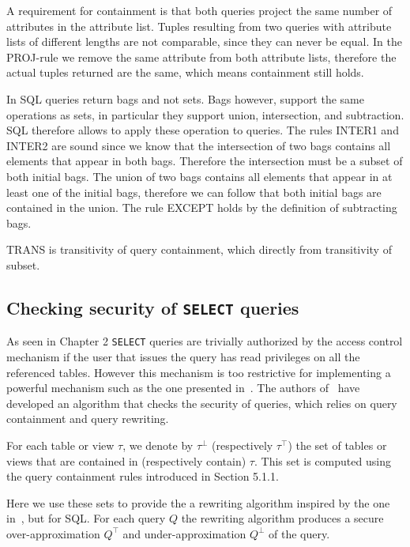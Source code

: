 A requirement for containment is that both queries project the same number of attributes in the attribute list. 
%
Tuples resulting from two queries with attribute lists of different lengths are not comparable, since they can never be equal.
%
In the PROJ-rule we remove the same attribute from both attribute lists, therefore the actual tuples returned are the same, which means containment still holds.

In SQL queries return bags and not sets.
%
Bags however, support the same operations as sets, in particular they support union, intersection, and subtraction.
%
SQL therefore allows to apply these operation to queries.
%
The rules INTER1 and INTER2 are sound since we know that the intersection of two bags contains all elements that appear in both bags.
%
Therefore the intersection must be a subset of both initial bags.
%
The union of two bags contains all elements that appear in at least one of the initial bags, therefore we can follow that both initial bags are contained in the union.
%
The rule EXCEPT holds by the definition of subtracting bags.

TRANS is transitivity of query containment, which directly from transitivity of subset.

\FloatBarrier
\subsection{Checking security of \texttt{SELECT} queries}

As seen in Chapter 2 \texttt{SELECT} queries are trivially authorized by the access control mechanism if the user that issues the query has read privileges on all the referenced tables.
%
However this mechanism is too restrictive for implementing a powerful mechanism such as the one presented in~\cite{guarnieri2016strong}.
%
The authors of~\cite{guarnieri2016strong} have developed an algorithm that checks the security of queries, which relies on query containment and query rewriting. 

For each table or view $\tau$, we denote by $\tau^\bot$ (respectively $\tau^\top$) the set of tables or views that are contained in (respectively contain) $\tau$.
%
This set is computed using the query containment rules introduced in Section 5.1.1.
%

Here we use these sets to provide the a rewriting algorithm inspired by the one in~\cite{guarnieri2016strong}, but for SQL.
%
For each query $Q$ the rewriting algorithm produces a secure over-approximation $Q^\top$ and under-approximation $Q^\bot$ of the query.

